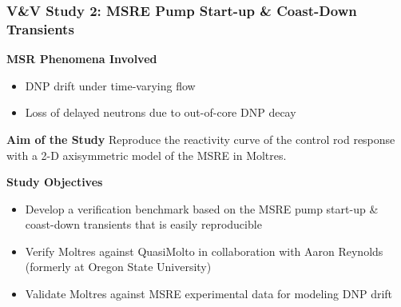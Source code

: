 \begin{frame}
  \frametitle{V\&V Study 2: MSRE Pump Start-up \& Coast-Down Transients}
  \begin{block}{\textbf{MSR Phenomena Involved}}
    \begin{itemize}
      \item DNP drift under time-varying flow
      \item Loss of delayed neutrons due to out-of-core DNP decay
    \end{itemize}
  \end{block}
  \begin{block}{\textbf{Aim of the Study}}
    Reproduce the reactivity curve of the control rod response with a 2-D axisymmetric model of the
    MSRE in Moltres.
  \end{block}
  \begin{block}{\textbf{Study Objectives}}
    \begin{itemize}
      \item Develop a verification benchmark based on the MSRE pump start-up \& coast-down
        transients that is easily reproducible
      \item Verify Moltres against QuasiMolto in collaboration with Aaron Reynolds
        (formerly at Oregon State University)
      \item Validate Moltres against MSRE experimental data for modeling \gls{DNP} drift
    \end{itemize}
  \end{block}
\end{frame}

